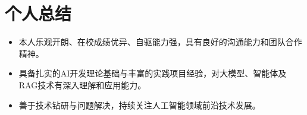 \documentclass{resume}
\begin{document}
\section{个人总结}

\begin{itemize}
  \item 本人乐观开朗、在校成绩优异、自驱能力强，具有良好的沟通能力和团队合作精神。
  \item 具备扎实的AI开发理论基础与丰富的实践项目经验，对大模型、智能体及RAG技术有深入理解和应用能力。
  \item 善于技术钻研与问题解决，持续关注人工智能领域前沿技术发展。
\end{itemize}
\end{document}
